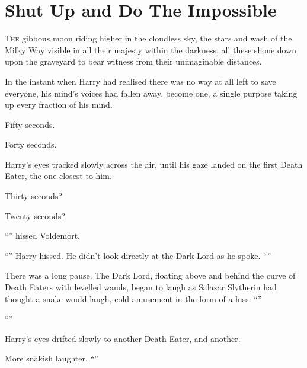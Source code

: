 \chapter{Shut Up and Do The Impossible}

\lettrine{T}{he} gibbous moon
riding higher in the cloudless sky, the stars and wash of the Milky Way visible in all their majesty within the darkness, all these shone down upon the graveyard to bear witness from their unimaginable distances.

In the instant when Harry had realised there was no way at all left to save everyone, his mind’s voices had fallen away, become one, a single purpose taking up every fraction of his mind.

Fifty seconds.

Forty seconds.

Harry’s eyes tracked slowly across the air, until his gaze landed on the first Death Eater, the one closest to him.

Thirty seconds?

Twenty seconds?

“” hissed Voldemort.

“” Harry hissed. He didn’t look directly at the Dark Lord as he spoke. “”

There was a long pause. The Dark Lord, floating above and behind the curve of Death Eaters with levelled wands, began to laugh as Salazar Slytherin had thought a snake would laugh, cold amusement in the form of a hiss. “”

“”

Harry’s eyes drifted slowly to another Death Eater, and another.

More snakish laughter. “”

